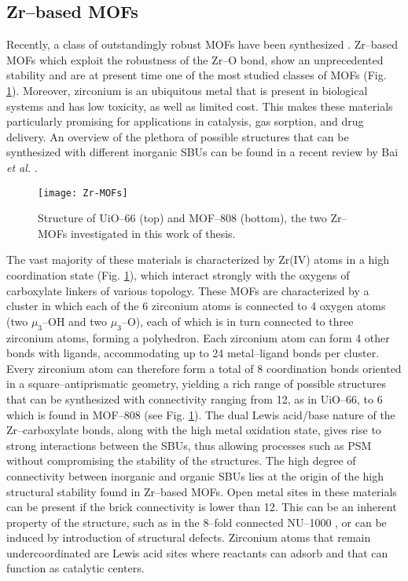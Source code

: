\subsection*{Zr--based MOFs}
Recently, a class of outstandingly robust MOFs have been synthesized \cite{furukawa2014water}. Zr--based MOFs\cite{bai2016zr} which exploit the robustness of the Zr--O bond, show an unprecedented stability and are at present time one of the most studied classes of MOFs (Fig. \ref{fig:Zr-MOFs}). Moreover, zirconium is an ubiquitous metal that is present in biological systems and has low toxicity, as well as limited cost. This makes these materials particularly promising for applications in catalysis, gas sorption, and drug delivery. An overview of the plethora of possible structures that can be synthesized with different inorganic SBUs can be found in a recent review by Bai \textit{et al.} \cite{bai2016zr}.
\npar
\begin{figure}[!htbp]
	\centering
 	\texttt{[image: Zr-MOFs]}
	\caption{Structure of UiO--66 (top) and MOF--808 (bottom), the two Zr--MOFs investigated in this work of thesis.}
	\label{fig:Zr-MOFs}
\end{figure}
The vast majority of these materials is characterized by Zr(IV) atoms in a high coordination state (Fig. \ref{fig:Zr-MOFs}), which interact strongly with the oxygens of carboxylate linkers of various topology. These MOFs are characterized by a  cluster in which each of the 6 zirconium atoms is connected to 4 oxygen atoms (two $\mu_3$--OH and two $\mu_3$--O), each of which is in turn connected to three zirconium atoms, forming a polyhedron. Each zirconium atom can form 4 other bonds with ligands, accommodating up to 24 metal--ligand bonds per cluster. Every zirconium atom can therefore form a total of 8 coordination bonds oriented in a square--antiprismatic geometry, yielding a rich range of possible structures that can be synthesized with connectivity ranging from 12, as in UiO--66\cite{cavka2008new}, to 6 which is found in MOF--808\cite{furukawa2014water} (see Fig. \ref{fig:Zr-MOFs}). The dual Lewis acid/base nature of the Zr--carboxylate bonds, along with the high metal oxidation state, gives rise to strong interactions between the SBUs, thus allowing processes such as PSM without compromising the stability of the structures. The high degree of connectivity between inorganic and organic SBUs lies at the origin of the high structural stability found in Zr--based MOFs\cite{bai2016zr, leus2016systematic}. Open metal sites in these materials can be present if the brick connectivity is lower than 12. This can be an inherent property of the structure, such as in the 8--fold connected NU--1000 \cite{mondloch2013vapor}, or can be induced by introduction of structural defects. Zirconium atoms that remain undercoordinated are Lewis acid sites where reactants can adsorb and that can function as catalytic centers.

